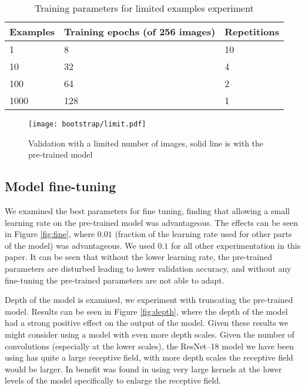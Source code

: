 \begin{table}[ht]
  \centering
    \caption{Training parameters for limited examples experiment}

  \begin{tabular}{ l  l  l}
    Examples & Training epochs (of 256 images) & Repetitions \\
    \toprule
    1 	  & 8 	& 10 \\
    10 	  & 32 	& 4  \\
    100   & 64 	& 2 \\
    1000  & 128 & 1 \\
    \bottomrule
  \end{tabular}
\label{fig:limit_params}
\end{table}



\begin{figure}[ht]
\centering
\texttt{[image: bootstrap/limit.pdf]}
\caption{Validation with a limited number of images, solid line is with the pre-trained model}  
\label{fig:limited}
\end{figure}



\subsection{Model fine-tuning}

We examined the best parameters for fine tuning, finding that allowing a small learning rate on the pre-trained model was advantageous. The effects can be seen in Figure \ref{fig:fine}, where $0.01$ (fraction of the learning rate used for other parts of the model) was advantageous. We used $ 0.1 $ for all other experimentation in this paper. It can be seen that without the lower learning rate, the pre-trained parameters are disturbed leading to lower validation accuracy, and without any fine-tuning the pre-trained parameters are not able to adapt.

Depth of the model is examined, we experiment with truncating the pre-trained model. Results can be seen in Figure \ref{fig:depth}, where the depth of the model had a strong positive effect on the output of the model. Given these results we might consider using a model with even more depth scales. Given the number of convolutions (especially at the lower scales), the ResNet--18 model we have been using has quite a large receptive field, with more depth scales the receptive field would be larger. In \cite{Peng2017} benefit was found in using very large kernels at the lower levels of the model specifically to enlarge the receptive field.

